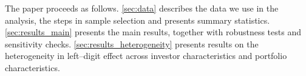 The paper proceeds as follows. \ref{sec:data} describes the data we use in the analysis, the steps in sample selection and presents summary statistics. \ref{sec:results_main} presents the main results, together with robustness tests and sensitivity checks. \ref{sec:results_heterogeneity} presents results on the heterogeneity in left--digit effect across investor characteristics and portfolio characteristics. 


